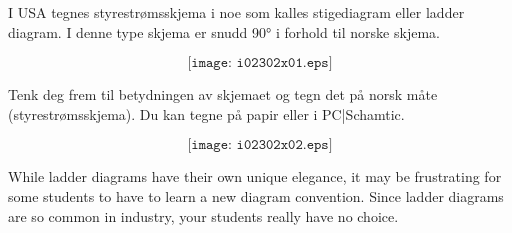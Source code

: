 

I USA tegnes styrestrømsskjema i noe som kalles stigediagram eller ladder diagram. I denne type skjema er snudd 90° i forhold til norske skjema. 

$$\texttt{[image: i02302x01.eps]}$$

Tenk deg frem til betydningen av skjemaet og tegn det på norsk måte (styrestrømsskjema). Du kan tegne på papir eller i PC|Schamtic. 








$$\texttt{[image: i02302x02.eps]}$$







While ladder diagrams have their own unique elegance, it may be frustrating for some students to have to learn a new diagram convention.  Since ladder diagrams are so common in industry, your students really have no choice.




